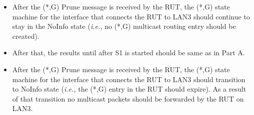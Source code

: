 \documentclass[11pt]{report}
\newcommand{\ie}{\emph{i.e.,}\xspace}
\begin{document}
\begin{itemize}

  \item After the (*,G) Prune message is received by the RUT,
  the (*,G) state machine for the interface that connects the RUT to
  LAN3 should continue to stay in the NoInfo state (\ie no (*,G) multicast
  routing entry should be created).

  \item After that, the results until after S1 is started should be same as in
  Part A.

  \item After the (*,G) Prune message is received by the RUT,
  the (*,G) state machine for the interface that connects the RUT to
  LAN3 should transition to NoInfo state
  (\ie the (*,G) entry in the RUT should expire).
  As a result of that transition no multicast packets should be
  forwarded by the RUT on LAN3.

\end{itemize}

\end{document}
